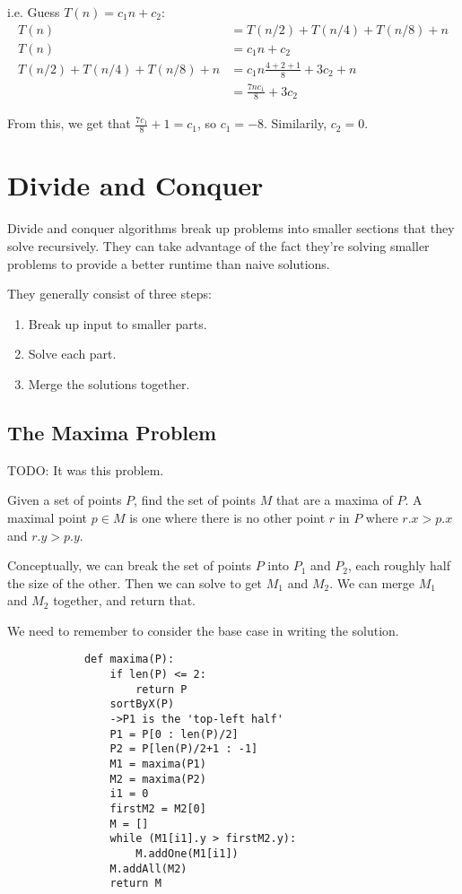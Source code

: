             i.e.
            Guess $T(n) = c_1 n + c_2$:
            \begin{align*}
                T(n) &= T(n/2) + T(n/4) + T(n/8) + n \\
                T(n) &= c_1 n + c_2 \\
                T(n/2) + T(n/4) + T(n/8) + n &= c_1 n\frac{4+2+1}{8} + 3 c_2 + n\\
                &= \frac{7 n c_1}{8} + 3 c_2
            \end{align*}

            From this, we get that $\frac{7c_1}{8} + 1 = c_1$, so $c_1 = -8$.
            Similarily, $c_2 = 0$.

\chapter{Divide and Conquer}
    Divide and conquer algorithms break up problems into smaller sections that
    they solve recursively. They can take advantage of the fact they're solving
    smaller problems to provide a better runtime than naive solutions.

    They generally consist of three steps:
    \begin{enumerate}
        \item Break up input to smaller parts.
        \item Solve each part.
        \item Merge the solutions together.
    \end{enumerate}

    \section{The Maxima Problem}
        TODO: It was this problem.

        Given a set of points $P$, find the set of points $M$ that are a maxima
        of $P$.
        A maximal point $p \in M$ is one where there is no other point $r$ in
        $P$ where $r.x > p.x$ and $r.y > p.y$.

        Conceptually, we can break the set of points $P$ into $P_1$ and $P_2$,
        each roughly half the size of the other. Then we can solve to get $M_1$
        and $M_2$. We can merge $M_1$ and $M_2$ together, and return that.

        We need to remember to consider the base case in writing the solution.

        \begin{verbatim}
            def maxima(P):
                if len(P) <= 2:
                    return P
                sortByX(P)
                ->P1 is the 'top-left half'
                P1 = P[0 : len(P)/2]
                P2 = P[len(P)/2+1 : -1]
                M1 = maxima(P1)
                M2 = maxima(P2)
                i1 = 0
                firstM2 = M2[0]
                M = []
                while (M1[i1].y > firstM2.y):
                    M.addOne(M1[i1])
                M.addAll(M2)
                return M
        \end{verbatim}


